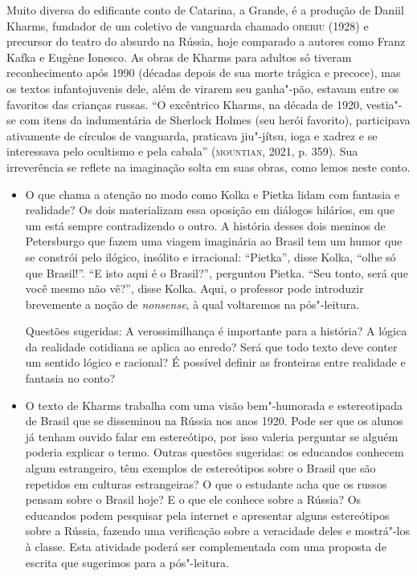 \documentclass[11pt]{extarticle}
\begin{document}

Muito diversa do edificante conto de Catarina, a Grande, é a produção
de Daniil Kharms, fundador de um coletivo de vanguarda chamado \textsc{oberiu}
(1928) e precursor do teatro do absurdo na Rússia, hoje comparado a
autores como Franz Kafka e Eugène Ionesco. As obras de Kharms para
adultos só tiveram reconhecimento após 1990 (décadas depois de sua
morte trágica e precoce), mas os textos infantojuvenis dele, além de
virarem seu ganha"-pão, estavam entre os favoritos das crianças russas.
``O excêntrico Kharms, na década de 1920, vestia"-se com itens da
indumentária de Sherlock Holmes (seu herói favorito), participava
ativamente de círculos de vanguarda, praticava jiu"-jítsu, ioga e xadrez
e se interessava pelo ocultismo e pela cabala'' (\textsc{mountian}, 2021, p.
359). Sua irreverência se reflete na imaginação solta em suas obras, como
lemos neste conto.


\begin {itemize}
\item O que chama a atenção no modo como Kolka e Pietka lidam com fantasia e
realidade? Os dois materializam essa oposição em diálogos hilários, em
que um está sempre contradizendo o outro. A história desses dois meninos
de Petersburgo que fazem uma viagem imaginária ao Brasil tem um humor
que se constrói pelo ilógico, insólito e irracional: ``Pietka'', disse
Kolka, ``olhe só que Brasil!''. ``E isto aqui é o Brasil?'', perguntou
Pietka. ``Seu tonto, será que você mesmo não vê?'', disse Kolka. Aqui, o
professor pode introduzir brevemente a noção de \emph{nonsense}, à qual
voltaremos na pós"-leitura.

Questões sugeridas: A verossimilhança é importante para a história? A
lógica da realidade cotidiana se aplica ao enredo? Será que todo texto
deve conter um sentido lógico e racional? É possível definir as
fronteiras entre realidade e fantasia no conto?

\item O texto de Kharms trabalha com uma visão bem"-humorada e estereotipada
de Brasil que se disseminou na Rússia nos anos 1920. Pode ser que os
alunos já tenham ouvido falar em estereótipo, por isso valeria perguntar
se alguém poderia explicar o termo. Outras questões sugeridas: os
educandos conhecem algum estrangeiro, têm exemplos de estereótipos sobre
o Brasil que são repetidos em culturas estrangeiras? O que o estudante
acha que os russos pensam sobre o Brasil hoje? E o que ele conhece sobre
a Rússia? Os educandos podem pesquisar pela internet e apresentar alguns
estereótipos sobre a Rússia, fazendo uma verificação sobre a veracidade
deles e mostrá"-los à classe. Esta atividade poderá ser complementada com
uma proposta de escrita que sugerimos para a pós"-leitura.
\end{itemize}
\end{document}
